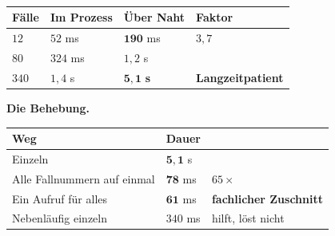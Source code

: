 \begin{merksatz}
\begin{center}
\begin{minipage}{0.9\textwidth}
\\
\\
\\
\end{minipage}
\end{center}

\begin{center}
\renewcommand{\arraystretch}{1.45}
\begin{tabular}{@{}P{2.2cm}P{2.2cm}P{2.2cm}P{2.2cm}@{}}
\toprule
\textbf{Fälle} & \textbf{Im Prozess} & \textbf{Über Naht} & \textbf{Faktor}\\
\midrule
$12$ & $52$ ms & $\mathbf{190}$ ms & $3{,}7$\\
$80$ & $324$ ms & $1{,}2$ s & \\
$340$ & $1{,}4$ s & \textcolor{akzent}{$\mathbf{5{,}1}$ \textbf{s}} & \textcolor{akzent}{\textbf{Langzeit\-patient}}\\
\bottomrule
\end{tabular}
\end{center}

\begin{center}
\begin{minipage}{0.88\textwidth}
\end{minipage}
\end{center}

\textbf{Die Behebung.}

\begin{center}
{\small
\renewcommand{\arraystretch}{1.45}
\begin{tabular}{@{}P{3.0cm}P{2.2cm}P{2.6cm}@{}}
\toprule
\textbf{Weg} & \textbf{Dauer} & \\
\midrule
Einzeln & $\mathbf{5{,}1}$ s & \\
Alle Fallnummern auf einmal & $\mathbf{78}$ ms & $65\times$\\
Ein Aufruf für alles & $\mathbf{61}$ ms & \textcolor{gruen}{\textbf{fachlicher Zuschnitt}}\\
Nebenläufig einzeln & $340$ ms & \textcolor{mittel}{hilft, löst nicht}\\
\bottomrule
\end{tabular}}
\end{center}


\end{merksatz}
